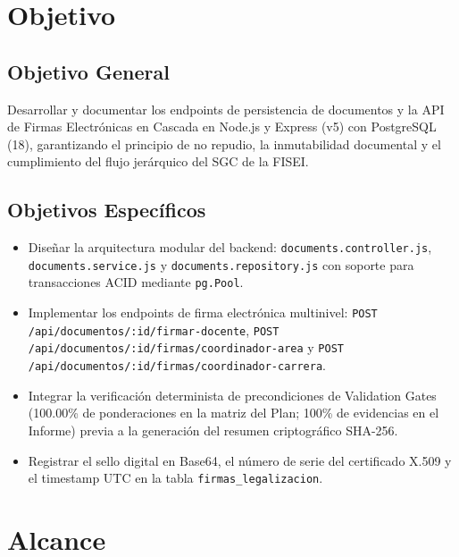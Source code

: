 \documentclass[12pt,a4paper]{article}
\begin{document}
\section{Objetivo}

\subsection{Objetivo General}
Desarrollar y documentar los endpoints de persistencia de documentos y la API de Firmas Electrónicas en Cascada en Node.js y Express (v5) con PostgreSQL (18), garantizando el principio de no repudio, la inmutabilidad documental y el cumplimiento del flujo jerárquico del SGC de la FISEI.

\subsection{Objetivos Específicos}
\begin{itemize}[leftmargin=1.5em, itemsep=1.5pt, topsep=1.5pt]
    \item Diseñar la arquitectura modular del backend: \texttt{documents.controller.js}, \texttt{documents.service.js} y \texttt{documents.repository.js} con soporte para transacciones ACID mediante \texttt{pg.Pool}.
    \item Implementar los endpoints de firma electrónica multinivel: \texttt{POST /api/documentos/:id/firmar-docente}, \texttt{POST /api/documentos/:id/firmas/coordinador-area} y \texttt{POST /api/documentos/:id/firmas/coordinador-carrera}.
    \item Integrar la verificación determinista de precondiciones de Validation Gates (100.00\% de ponderaciones en la matriz del Plan; 100\% de evidencias en el Informe) previa a la generación del resumen criptográfico SHA-256.
    \item Registrar el sello digital en Base64, el número de serie del certificado X.509 y el timestamp UTC en la tabla \texttt{firmas\_legalizacion}.
\end{itemize}

\section{Alcance}
\end{document}
